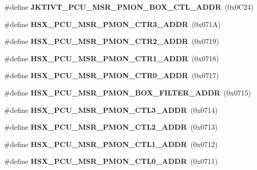 \begin{DoxyCompactItemize}
\item 
\#define {\bfseries J\+K\+T\+I\+V\+T\+\_\+\+P\+C\+U\+\_\+\+M\+S\+R\+\_\+\+P\+M\+O\+N\+\_\+\+B\+O\+X\+\_\+\+C\+T\+L\+\_\+\+A\+D\+D\+R}~(0x0\+C24)\label{types_8h_a0f6f4bf765e37b43b61d6990ebbf8f1b}

\item 
\#define {\bfseries H\+S\+X\+\_\+\+P\+C\+U\+\_\+\+M\+S\+R\+\_\+\+P\+M\+O\+N\+\_\+\+C\+T\+R3\+\_\+\+A\+D\+D\+R}~(0x071\+A)\label{types_8h_ad134650f1639391f3d610c70ef9f1e96}

\item 
\#define {\bfseries H\+S\+X\+\_\+\+P\+C\+U\+\_\+\+M\+S\+R\+\_\+\+P\+M\+O\+N\+\_\+\+C\+T\+R2\+\_\+\+A\+D\+D\+R}~(0x0719)\label{types_8h_ab8068f1d692e5ced75fd5262c5d8cb8f}

\item 
\#define {\bfseries H\+S\+X\+\_\+\+P\+C\+U\+\_\+\+M\+S\+R\+\_\+\+P\+M\+O\+N\+\_\+\+C\+T\+R1\+\_\+\+A\+D\+D\+R}~(0x0718)\label{types_8h_af364a115d3c96668cd4f7cc49de536c0}

\item 
\#define {\bfseries H\+S\+X\+\_\+\+P\+C\+U\+\_\+\+M\+S\+R\+\_\+\+P\+M\+O\+N\+\_\+\+C\+T\+R0\+\_\+\+A\+D\+D\+R}~(0x0717)\label{types_8h_a9c523fc1e96d8d3f84af7139e1aea411}

\item 
\#define {\bfseries H\+S\+X\+\_\+\+P\+C\+U\+\_\+\+M\+S\+R\+\_\+\+P\+M\+O\+N\+\_\+\+B\+O\+X\+\_\+\+F\+I\+L\+T\+E\+R\+\_\+\+A\+D\+D\+R}~(0x0715)\label{types_8h_a4df4be5e87246efb1c7c5efc60c3d54b}

\item 
\#define {\bfseries H\+S\+X\+\_\+\+P\+C\+U\+\_\+\+M\+S\+R\+\_\+\+P\+M\+O\+N\+\_\+\+C\+T\+L3\+\_\+\+A\+D\+D\+R}~(0x0714)\label{types_8h_ab6a84afc8059ff3fbdd3e31c4c5c7eab}

\item 
\#define {\bfseries H\+S\+X\+\_\+\+P\+C\+U\+\_\+\+M\+S\+R\+\_\+\+P\+M\+O\+N\+\_\+\+C\+T\+L2\+\_\+\+A\+D\+D\+R}~(0x0713)\label{types_8h_aff25e26c9829b71d5e152803b05d5b87}

\item 
\#define {\bfseries H\+S\+X\+\_\+\+P\+C\+U\+\_\+\+M\+S\+R\+\_\+\+P\+M\+O\+N\+\_\+\+C\+T\+L1\+\_\+\+A\+D\+D\+R}~(0x0712)\label{types_8h_ae4771b69f2b2f8768dfb6864f8f01938}

\item 
\#define {\bfseries H\+S\+X\+\_\+\+P\+C\+U\+\_\+\+M\+S\+R\+\_\+\+P\+M\+O\+N\+\_\+\+C\+T\+L0\+\_\+\+A\+D\+D\+R}~(0x0711)\label{types_8h_ae2ba1df84934237c90c8960b9b8087c8}


\end{DoxyCompactItemize}
